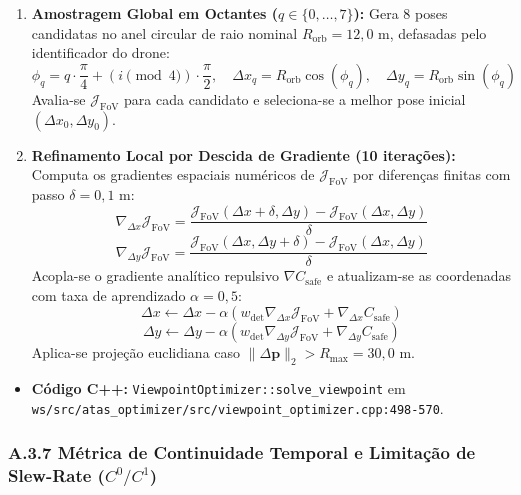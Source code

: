 \documentclass[
  brazilian,
  a4paper]{article}
\providecommand{\tightlist}{%
  \setlength{\itemsep}{0pt}\setlength{\parskip}{0pt}}
\begin{document}
\begin{enumerate}
\def\labelenumi{\arabic{enumi}.}
\tightlist
\item
  \textbf{Amostragem Global em Octantes (\(q \in \{0, \dots, 7\}\)):}
  Gera 8 poses candidatas no anel circular de raio nominal
  \(R_{\text{orb}} = 12{,}0\text{ m}\), defasadas pelo identificador do
  drone:
  \[\phi_q = q \cdot \frac{\pi}{4} + (i \pmod 4) \cdot \frac{\pi}{2}, \quad \Delta x_q = R_{\text{orb}} \cos(\phi_q), \quad \Delta y_q = R_{\text{orb}} \sin(\phi_q)\]
  Avalia-se \(\mathcal{J}_{\text{FoV}}\) para cada candidato e
  seleciona-se a melhor pose inicial \((\Delta x_0, \Delta y_0)\).
\item
  \textbf{Refinamento Local por Descida de Gradiente (10 iterações):}
  Computa os gradientes espaciais numéricos de
  \(\mathcal{J}_{\text{FoV}}\) por diferenças finitas com passo
  \(\delta = 0{,}1\text{ m}\):
  \[\nabla_{\Delta x} \mathcal{J}_{\text{FoV}} = \frac{\mathcal{J}_{\text{FoV}}(\Delta x + \delta, \Delta y) - \mathcal{J}_{\text{FoV}}(\Delta x, \Delta y)}{\delta}\]
  \[\nabla_{\Delta y} \mathcal{J}_{\text{FoV}} = \frac{\mathcal{J}_{\text{FoV}}(\Delta x, \Delta y + \delta) - \mathcal{J}_{\text{FoV}}(\Delta x, \Delta y)}{\delta}\]
  Acopla-se o gradiente analítico repulsivo \(\nabla C_{\text{safe}}\) e
  atualizam-se as coordenadas com taxa de aprendizado
  \(\alpha = 0{,}5\):
  \[\Delta x \leftarrow \Delta x - \alpha \left(w_{\text{det}} \nabla_{\Delta x} \mathcal{J}_{\text{FoV}} + \nabla_{\Delta x} C_{\text{safe}}\right)\]
  \[\Delta y \leftarrow \Delta y - \alpha \left(w_{\text{det}} \nabla_{\Delta y} \mathcal{J}_{\text{FoV}} + \nabla_{\Delta y} C_{\text{safe}}\right)\]
  Aplica-se projeção euclidiana caso
  \(\|\Delta \mathbf{p}\|_2 > R_{\text{max}} = 30{,}0\text{ m}\).
\end{enumerate}

\begin{itemize}
\tightlist
\item
  \textbf{Código C++:} \texttt{ViewpointOptimizer:\allowbreak{}:\allowbreak{}solve\_\allowbreak{}viewpoint} em
  \texttt{ws/\allowbreak{}src/\allowbreak{}atas\_\allowbreak{}optimizer/\allowbreak{}src/\allowbreak{}viewpoint\_\allowbreak{}optimizer.\allowbreak{}cpp:\allowbreak{}498-570}.
\end{itemize}

\subsubsection{\texorpdfstring{A.3.7 Métrica de Continuidade Temporal e
Limitação de Slew-Rate
(\(C^0 / C^1\))}{A.3.7 Métrica de Continuidade Temporal e Limitação de Slew-Rate (C\^{}0 / C\^{}1)}}\label{a.3.7-muxe9trica-de-continuidade-temporal-e-limitauxe7uxe3o-de-slew-rate-c0-c1}
\end{document}
